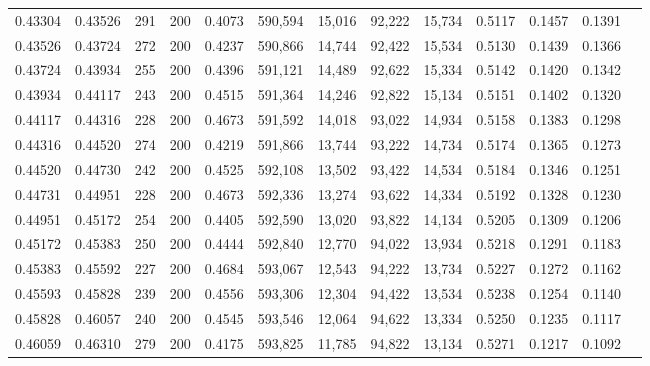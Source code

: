 \begin{tabular}{rrrrrrrrrrrrr}
0.43304 & 0.43526 &    291 & 200 &                                     0.4073 & 590,594 &  15,016 &  92,222 &  15,734 & 0.5117 & 0.1457 & 0.1391 \\
0.43526 & 0.43724 &    272 & 200 &                                     0.4237 & 590,866 &  14,744 &  92,422 &  15,534 & 0.5130 & 0.1439 & 0.1366 \\
0.43724 & 0.43934 &    255 & 200 &                                     0.4396 & 591,121 &  14,489 &  92,622 &  15,334 & 0.5142 & 0.1420 & 0.1342 \\
0.43934 & 0.44117 &    243 & 200 &                                     0.4515 & 591,364 &  14,246 &  92,822 &  15,134 & 0.5151 & 0.1402 & 0.1320 \\
0.44117 & 0.44316 &    228 & 200 &                                     0.4673 & 591,592 &  14,018 &  93,022 &  14,934 & 0.5158 & 0.1383 & 0.1298 \\
0.44316 & 0.44520 &    274 & 200 &                                     0.4219 & 591,866 &  13,744 &  93,222 &  14,734 & 0.5174 & 0.1365 & 0.1273 \\
0.44520 & 0.44730 &    242 & 200 &                                     0.4525 & 592,108 &  13,502 &  93,422 &  14,534 & 0.5184 & 0.1346 & 0.1251 \\
0.44731 & 0.44951 &    228 & 200 &                                     0.4673 & 592,336 &  13,274 &  93,622 &  14,334 & 0.5192 & 0.1328 & 0.1230 \\
0.44951 & 0.45172 &    254 & 200 &                                     0.4405 & 592,590 &  13,020 &  93,822 &  14,134 & 0.5205 & 0.1309 & 0.1206 \\
0.45172 & 0.45383 &    250 & 200 &                                     0.4444 & 592,840 &  12,770 &  94,022 &  13,934 & 0.5218 & 0.1291 & 0.1183 \\
0.45383 & 0.45592 &    227 & 200 &                                     0.4684 & 593,067 &  12,543 &  94,222 &  13,734 & 0.5227 & 0.1272 & 0.1162 \\
0.45593 & 0.45828 &    239 & 200 &                                     0.4556 & 593,306 &  12,304 &  94,422 &  13,534 & 0.5238 & 0.1254 & 0.1140 \\
0.45828 & 0.46057 &    240 & 200 &                                     0.4545 & 593,546 &  12,064 &  94,622 &  13,334 & 0.5250 & 0.1235 & 0.1117 \\
0.46059 & 0.46310 &    279 & 200 &                                     0.4175 & 593,825 &  11,785 &  94,822 &  13,134 & 0.5271 & 0.1217 & 0.1092 \\

\end{tabular}
